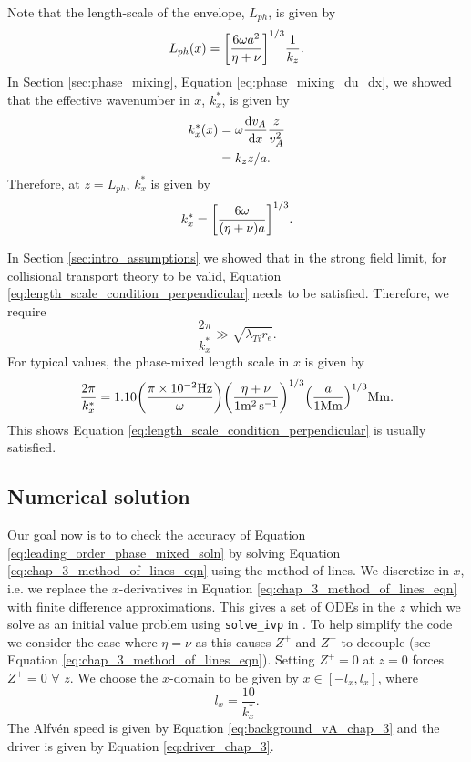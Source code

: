Note that the length-scale of the envelope, $L_{ph}$, is given by
\begin{equation}
    \label{eq:phase_mixed_z_length_scale}
    L_{ph}(x) = \qty[\frac{6\omega a^2}{\eta+\nu}]^{1/3}\frac{1}{k_z}.
\end{equation}
In Section \ref{sec:phase_mixing}, Equation \eqref{eq:phase_mixing_du_dx}, we showed that the effective wavenumber in $x$, $k_x^*$, is given by
\begin{equation}
    \label{eq:kx_star}
    \begin{aligned}
    k_x^*(x) &= \omega \dv{v_A}{x}\frac{z}{v_A^2} \\
    &=k_z z / a.
    \end{aligned}
\end{equation}
Therefore, at $z=L_{ph}$, $k_x^*$ is given by
\begin{equation}
    \label{eq:phase_mixed_x_length_scale}
    k_x^*= \qty[\frac{6\omega }{(\eta+\nu)a}]^{1/3}.
\end{equation}

In Section \ref{sec:intro_assumptions} we showed that in the strong field limit, for collisional transport theory to be valid, Equation \eqref{eq:length_scale_condition_perpendicular} needs to be satisfied. Therefore, we require
\begin{equation}
    \frac{2\pi}{k_x^*} \gg \sqrt{\lambda_{Ti} r_e}.
\end{equation}
For typical values, the phase-mixed length scale in $x$ is given by
\begin{equation}
    \frac{2\pi}{k_x^*}=1.10\qty(\frac{\pi\times10^{-2}\si{.Hz}}{\omega})\qty(\frac{\eta+\nu}{1\si{.m^2.s^{-1}}})^{1/3}\qty(\frac{a}{1\si{.Mm}})^{1/3}\si{.Mm}.
\end{equation}
This shows Equation \eqref{eq:length_scale_condition_perpendicular} is usually satisfied.

\subsection{Numerical solution}

Our goal now is to to check the accuracy of Equation \eqref{eq:leading_order_phase_mixed_soln} by solving Equation \eqref{eq:chap_3_method_of_lines_eqn} using the method of lines. We discretize in $x$, i.e. we replace the $x$-derivatives in Equation \eqref{eq:chap_3_method_of_lines_eqn} with finite difference approximations. This gives a set of ODEs in the $z$ which we solve as an initial value problem using \texttt{solve\_ivp} in \citet{SciPy2020}. To help simplify the code we consider the case where $\eta=\nu$ as this causes $Z^{+}$ and $Z^{-}$ to decouple (see Equation \eqref{eq:chap_3_method_of_lines_eqn}). Setting $Z^{+}=0$ at $z=0$ forces $Z^{+}=0$ $\forall$ $z$. We choose the $x$-domain to be given by $x\in[-l_x,l_x]$, 
where
\[l_x = \frac{10}{k_x^*}.\]
The Alfv\'en speed is given by Equation \eqref{eq:background_vA_chap_3} and the driver is given by  Equation \eqref{eq:driver_chap_3}.

